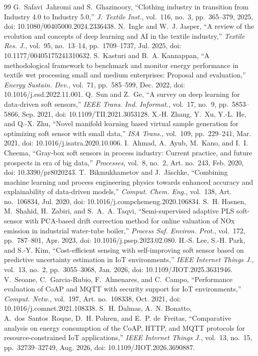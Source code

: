 \documentclass[journal]{IEEEtran}
\begin{document}
\begin{thebibliography}{99}
 G.~Safavi~Jahromi and S.~Ghazinoory, ``Clothing industry in transition from Industry 4.0 to Industry 5.0,'' \emph{J. Textile Inst.}, vol.~116, no.~3, pp.~365--379, 2025, doi: 10.1080/00405000.2024.2336438.
 N.~Ingle and W.~J. Jasper, ``A review of the evolution and concepts of deep learning and AI in the textile industry,'' \emph{Textile Res. J.}, vol.~95, no.~13--14, pp.~1709--1737, Jul. 2025, doi: 10.1177/00405175241310632.
 S.~Kasturi and B.~A. Kannappan, ``A methodological framework to benchmark and monitor energy performance in textile wet processing small and medium enterprises: Proposal and evaluation,'' \emph{Energy Sustain. Dev.}, vol.~71, pp.~585--599, Dec. 2022, doi: 10.1016/j.esd.2022.11.001.
 Q.~Sun and Z.~Ge, ``A survey on deep learning for data-driven soft sensors,'' \emph{IEEE Trans. Ind. Informat.}, vol.~17, no.~9, pp.~5853--5866, Sep. 2021, doi: 10.1109/TII.2021.3053128.
 X.-H. Zhang, Y.~Xu, Y.-L. He, and Q.-X. Zhu, ``Novel manifold learning based virtual sample generation for optimizing soft sensor with small data,'' \emph{ISA Trans.}, vol.~109, pp.~229--241, Mar. 2021, doi: 10.1016/j.isatra.2020.10.006.
 I.~Ahmad, A.~Ayub, M.~Kano, and I.~I. Cheema, ``Gray-box soft sensors in process industry: Current practice, and future prospects in era of big data,'' \emph{Processes}, vol.~8, no.~2, Art. no.~243, Feb. 2020, doi: 10.3390/pr8020243.
 T.~Bikmukhametov and J.~J\"{a}schke, ``Combining machine learning and process engineering physics towards enhanced accuracy and explainability of data-driven models,'' \emph{Comput. Chem. Eng.}, vol.~138, Art. no.~106834, Jul. 2020, doi: 10.1016/j.compchemeng.2020.106834.
 S.~H. Hasnen, M.~Shahid, H.~Zabiri, and S.~A.~A. Taqvi, ``Semi-supervised adaptive PLS soft-sensor with PCA-based drift correction method for online valuation of NOx emission in industrial water-tube boiler,'' \emph{Process Saf. Environ. Prot.}, vol.~172, pp.~787--801, Apr. 2023, doi: 10.1016/j.psep.2023.02.080.
 H.-S. Lee, S.-H. Park, and S.-Y. Kim, ``Cost-efficient sensing with self-improving soft sensor based on predictive uncertainty estimation in IoT environments,'' \emph{IEEE Internet Things J.}, vol.~13, no.~2, pp.~3055--3068, Jan. 2026, doi: 10.1109/JIOT.2025.3631946.
 V.~Seoane, C.~Garcia-Rubio, F.~Almenares, and C.~Campo, ``Performance evaluation of CoAP and MQTT with security support for IoT environments,'' \emph{Comput. Netw.}, vol.~197, Art. no.~108338, Oct. 2021, doi: 10.1016/j.comnet.2021.108338.
 S.~H. Dalmas, A.~N. Bonatto, A.~dos~Santos~Roque, D.~H. Pohren, and E.~P. de~Freitas, ``Comparative analysis on energy consumption of the CoAP, HTTP, and MQTT protocols for resource-constrained IoT applications,'' \emph{IEEE Internet Things J.}, vol.~13, no.~15, pp.~32739--32749, Aug. 2026, doi: 10.1109/JIOT.2026.3690887.
\end{thebibliography}
\end{document}
